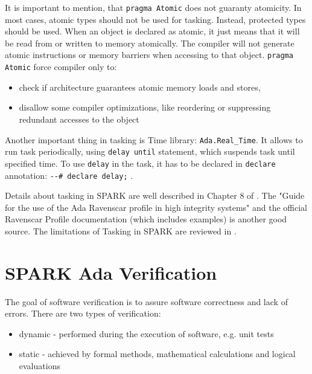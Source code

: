 It is important to mention, that \lstinline{pragma Atomic} does not guaranty atomicity. In most cases, atomic types should not be used for tasking. Instead, protected types should be used. When an object is declared as atomic, it just means that it will be read from or written to memory atomically. The compiler will not generate atomic instructions or memory barriers when accessing to that object. \lstinline{pragma Atomic} force compiler only to:
\begin{itemize}
	\item check if architecture guarantees atomic memory loads and stores,
	\item disallow some compiler optimizations, like reordering or suppressing redundant accesses to the object
\end{itemize}

Another important thing in tasking is Time library: \lstinline{Ada.Real_Time}. It allows to run task periodically, using \lstinline{delay until} statement, which suspends task until specified time. To use \lstinline{delay} in the task, it has to be declared in \lstinline{declare} annotation: \lstinline{--# declare delay;} \cite{Barnes:Book}.

Details about tasking in SPARK are well described in Chapter 8 of \cite{Barnes:Book}. The "Guide for the use of the Ada Ravenscar profile in high integrity systems" \cite{Ravenscar:Article} and the official Ravenscar Profile documentation (which includes examples) \cite{Ravenscar:Online} is another good source. The limitations of Tasking in SPARK are reviewed in \cite{IssuesWithRavenscar:Paper}.



\section{SPARK Ada Verification}
\label{background:sparkverification}


The goal of software verification is to assure software correctness and lack of errors. There are two types of verification:
\begin{itemize}
	\item dynamic - performed during the execution of software, e.g. unit tests
	\item static - achieved by formal methods, mathematical calculations and logical evaluations
\end{itemize}

